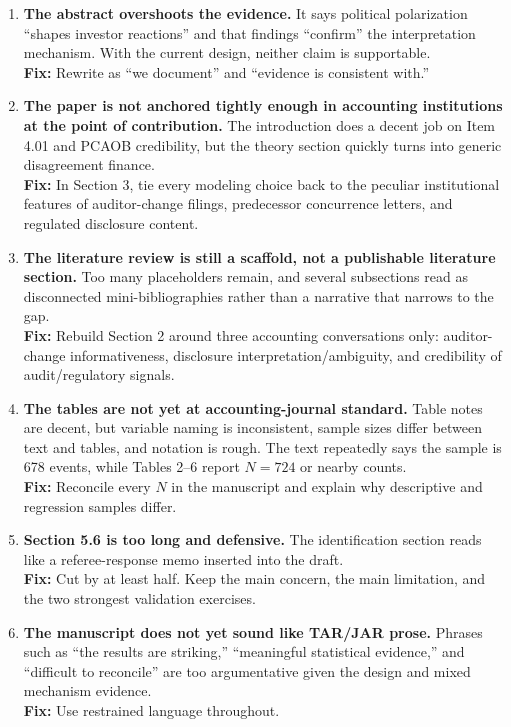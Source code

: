 \documentclass[11pt]{article}
\begin{document}
\begin{enumerate}[leftmargin=1.5em]
    \item \textbf{The abstract overshoots the evidence.} It says political polarization ``shapes investor reactions'' and that findings ``confirm'' the interpretation mechanism. With the current design, neither claim is supportable.\\
    \textbf{Fix:} Rewrite as ``we document'' and ``evidence is consistent with.''

    \item \textbf{The paper is not anchored tightly enough in accounting institutions at the point of contribution.} The introduction does a decent job on Item 4.01 and PCAOB credibility, but the theory section quickly turns into generic disagreement finance.\\
    \textbf{Fix:} In Section 3, tie every modeling choice back to the peculiar institutional features of auditor-change filings, predecessor concurrence letters, and regulated disclosure content.

    \item \textbf{The literature review is still a scaffold, not a publishable literature section.} Too many placeholders remain, and several subsections read as disconnected mini-bibliographies rather than a narrative that narrows to the gap.\\
    \textbf{Fix:} Rebuild Section 2 around three accounting conversations only: auditor-change informativeness, disclosure interpretation/ambiguity, and credibility of audit/regulatory signals.

    \item \textbf{The tables are not yet at accounting-journal standard.} Table notes are decent, but variable naming is inconsistent, sample sizes differ between text and tables, and notation is rough. The text repeatedly says the sample is 678 events, while Tables 2--6 report $N=724$ or nearby counts.\\
    \textbf{Fix:} Reconcile every $N$ in the manuscript and explain why descriptive and regression samples differ.

    \item \textbf{Section 5.6 is too long and defensive.} The identification section reads like a referee-response memo inserted into the draft.\\
    \textbf{Fix:} Cut by at least half. Keep the main concern, the main limitation, and the two strongest validation exercises.

    \item \textbf{The manuscript does not yet sound like TAR/JAR prose.} Phrases such as ``the results are striking,'' ``meaningful statistical evidence,'' and ``difficult to reconcile'' are too argumentative given the design and mixed mechanism evidence.\\
    \textbf{Fix:} Use restrained language throughout.
\end{enumerate}
\end{document}
